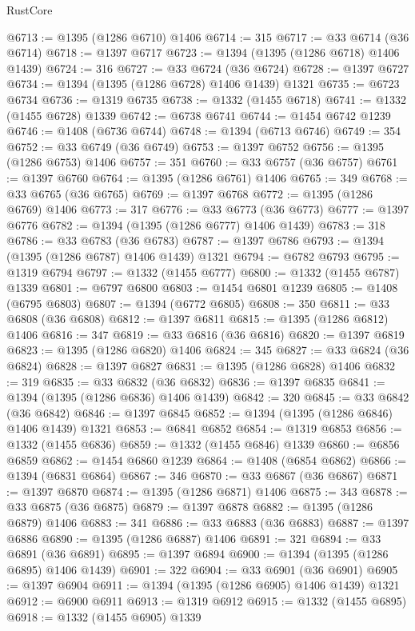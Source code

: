 \begin{lexlean}{RustCore}
\begin{coremodule}
@6713 := @1395 (@1286 @6710) @1406
@6714 := 315
@6717 := @33 @6714 (@36 @6714)
@6718 := @1397 @6717
@6723 := @1394 (@1395 (@1286 @6718) @1406 @1439)
@6724 := 316
@6727 := @33 @6724 (@36 @6724)
@6728 := @1397 @6727
@6734 := @1394 (@1395 (@1286 @6728) @1406 @1439) @1321
@6735 := @6723 @6734
@6736 := @1319 @6735
@6738 := @1332 (@1455 @6718)
@6741 := @1332 (@1455 @6728) @1339
@6742 := @6738 @6741
@6744 := @1454 @6742 @1239
@6746 := @1408 (@6736 @6744)
@6748 := @1394 (@6713 @6746)
@6749 := 354
@6752 := @33 @6749 (@36 @6749)
@6753 := @1397 @6752
@6756 := @1395 (@1286 @6753) @1406
@6757 := 351
@6760 := @33 @6757 (@36 @6757)
@6761 := @1397 @6760
@6764 := @1395 (@1286 @6761) @1406
@6765 := 349
@6768 := @33 @6765 (@36 @6765)
@6769 := @1397 @6768
@6772 := @1395 (@1286 @6769) @1406
@6773 := 317
@6776 := @33 @6773 (@36 @6773)
@6777 := @1397 @6776
@6782 := @1394 (@1395 (@1286 @6777) @1406 @1439)
@6783 := 318
@6786 := @33 @6783 (@36 @6783)
@6787 := @1397 @6786
@6793 := @1394 (@1395 (@1286 @6787) @1406 @1439) @1321
@6794 := @6782 @6793
@6795 := @1319 @6794
@6797 := @1332 (@1455 @6777)
@6800 := @1332 (@1455 @6787) @1339
@6801 := @6797 @6800
@6803 := @1454 @6801 @1239
@6805 := @1408 (@6795 @6803)
@6807 := @1394 (@6772 @6805)
@6808 := 350
@6811 := @33 @6808 (@36 @6808)
@6812 := @1397 @6811
@6815 := @1395 (@1286 @6812) @1406
@6816 := 347
@6819 := @33 @6816 (@36 @6816)
@6820 := @1397 @6819
@6823 := @1395 (@1286 @6820) @1406
@6824 := 345
@6827 := @33 @6824 (@36 @6824)
@6828 := @1397 @6827
@6831 := @1395 (@1286 @6828) @1406
@6832 := 319
@6835 := @33 @6832 (@36 @6832)
@6836 := @1397 @6835
@6841 := @1394 (@1395 (@1286 @6836) @1406 @1439)
@6842 := 320
@6845 := @33 @6842 (@36 @6842)
@6846 := @1397 @6845
@6852 := @1394 (@1395 (@1286 @6846) @1406 @1439) @1321
@6853 := @6841 @6852
@6854 := @1319 @6853
@6856 := @1332 (@1455 @6836)
@6859 := @1332 (@1455 @6846) @1339
@6860 := @6856 @6859
@6862 := @1454 @6860 @1239
@6864 := @1408 (@6854 @6862)
@6866 := @1394 (@6831 @6864)
@6867 := 346
@6870 := @33 @6867 (@36 @6867)
@6871 := @1397 @6870
@6874 := @1395 (@1286 @6871) @1406
@6875 := 343
@6878 := @33 @6875 (@36 @6875)
@6879 := @1397 @6878
@6882 := @1395 (@1286 @6879) @1406
@6883 := 341
@6886 := @33 @6883 (@36 @6883)
@6887 := @1397 @6886
@6890 := @1395 (@1286 @6887) @1406
@6891 := 321
@6894 := @33 @6891 (@36 @6891)
@6895 := @1397 @6894
@6900 := @1394 (@1395 (@1286 @6895) @1406 @1439)
@6901 := 322
@6904 := @33 @6901 (@36 @6901)
@6905 := @1397 @6904
@6911 := @1394 (@1395 (@1286 @6905) @1406 @1439) @1321
@6912 := @6900 @6911
@6913 := @1319 @6912
@6915 := @1332 (@1455 @6895)
@6918 := @1332 (@1455 @6905) @1339

\end{coremodule}
\end{lexlean}
